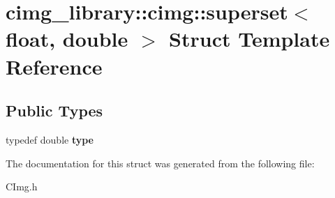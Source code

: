 \hypertarget{structcimg__library_1_1cimg_1_1superset_3_01float_00_01double_01_4}{\section{cimg\-\_\-library\-:\-:cimg\-:\-:superset$<$ float, double $>$ Struct Template Reference}
\label{structcimg__library_1_1cimg_1_1superset_3_01float_00_01double_01_4}
}
\subsection*{Public Types}
\begin{DoxyCompactItemize}
\item 
\hypertarget{structcimg__library_1_1cimg_1_1superset_3_01float_00_01double_01_4_af02367524fbe041fed6c22db634fcd38}{typedef double {\bfseries type}}\label{structcimg__library_1_1cimg_1_1superset_3_01float_00_01double_01_4_af02367524fbe041fed6c22db634fcd38}

\end{DoxyCompactItemize}


The documentation for this struct was generated from the following file\-:\begin{DoxyCompactItemize}
\item 
C\-Img.\-h\end{DoxyCompactItemize}
